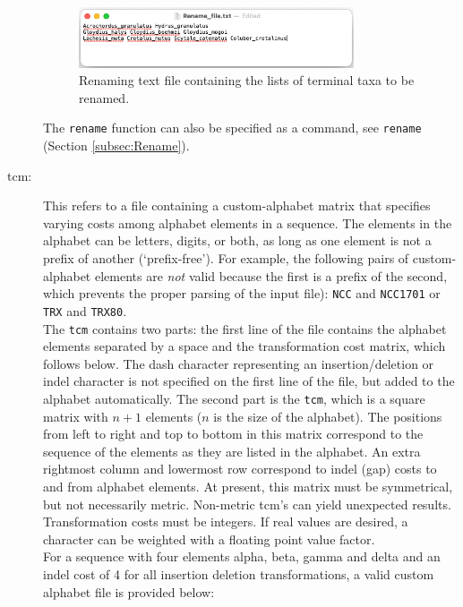 \begin{description}
		\begin{figure}
		\centering
		\includegraphics[width=0.8\textwidth]{Rename_file.jpg}
		\caption{Renaming text file containing the lists of terminal taxa to be renamed.}
		\label{renamefile}
		\end{figure}
		
		The \texttt{rename} function can also be specified as a command, see \texttt{rename}
		(Section \ref{subsec:Rename}).
					 
		\item [tcm:] This refers to a file containing a custom-alphabet matrix that specifies varying 
		costs among alphabet elements in a sequence. The elements in the alphabet can be letters, 
		digits, or both, as long as one element is not a prefix of another (`prefix-free'). For example, 
		the following pairs of custom-alphabet elements are \emph{not} valid because the first is a 
		prefix of the second, 	which prevents the proper parsing of the input file): \texttt{NCC} and 
		\texttt{NCC1701} or \texttt{TRX} and \texttt{TRX80}. \\
		
		The \texttt{tcm} contains two parts: the first line of the file contains the alphabet elements 
		separated by a space and the transformation cost matrix, which follows below. The dash 
		character representing an insertion/deletion or indel character is not specified on the first 
		line of the file, but added to the alphabet automatically. The second part is the \texttt{tcm}, 
		which is a square matrix with $n + 1$ elements ($n$ is the size of the alphabet). 
		The positions from left to right and top to bottom in this matrix correspond to the sequence 
		of the elements as they are listed in the alphabet. An extra rightmost column and lowermost
		row correspond to indel (gap) costs to and from alphabet elements. At present, this matrix 
		must be symmetrical, but not necessarily metric. Non-metric tcm's can yield unexpected 
		results. Transformation costs must be integers. If real values are desired, a character can 
		be weighted with a floating point value factor. \\
		
		For a sequence with four elements alpha, beta, gamma and delta and an indel cost of 4 
		for all insertion deletion transformations, a valid custom alphabet file is provided below:


\end{description}
